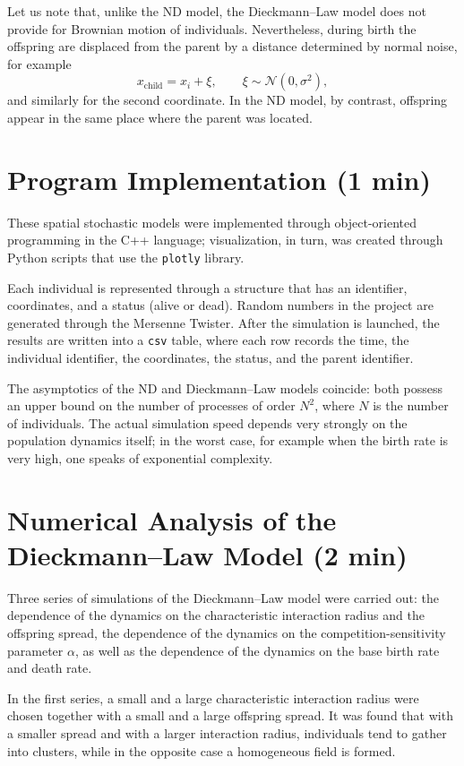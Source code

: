 \documentclass[12pt,a4paper]{article}
\begin{document}
Let us note that, unlike the ND model, the Dieckmann--Law model does not provide for Brownian motion of individuals. Nevertheless, during birth the offspring are displaced from the parent by a distance determined by normal noise, for example
\[
x_{\text{child}} = x_i + \xi,
\qquad
\xi \sim \mathcal{N}(0, \sigma^2),
\]
and similarly for the second coordinate. In the ND model, by contrast, offspring appear in the same place where the parent was located.

\section*{Program Implementation (1 min)}
These spatial stochastic models were implemented through object-oriented programming in the C++ language; visualization, in turn, was created through Python scripts that use the \texttt{plotly} library.

Each individual is represented through a structure that has an identifier, coordinates, and a status (alive or dead). Random numbers in the project are generated through the Mersenne Twister. After the simulation is launched, the results are written into a \texttt{csv} table, where each row records the time, the individual identifier, the coordinates, the status, and the parent identifier.

The asymptotics of the ND and Dieckmann--Law models coincide: both possess an upper bound on the number of processes of order $N^2$, where $N$ is the number of individuals. The actual simulation speed depends very strongly on the population dynamics itself; in the worst case, for example when the birth rate is very high, one speaks of exponential complexity.

\section*{Numerical Analysis of the Dieckmann--Law Model (2 min)}
Three series of simulations of the Dieckmann--Law model were carried out: the dependence of the dynamics on the characteristic interaction radius and the offspring spread, the dependence of the dynamics on the competition-sensitivity parameter $\alpha$, as well as the dependence of the dynamics on the base birth rate and death rate.

In the first series, a small and a large characteristic interaction radius were chosen together with a small and a large offspring spread. It was found that with a smaller spread and with a larger interaction radius, individuals tend to gather into clusters, while in the opposite case a homogeneous field is formed.
\end{document}
